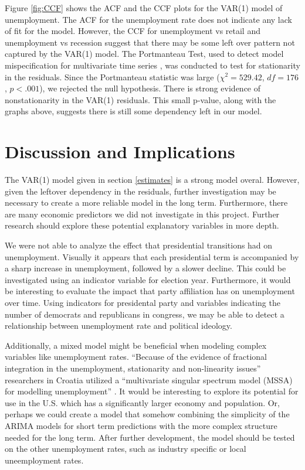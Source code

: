 \documentclass[twoside,twocolumn]{article}
\begin{document}
Figure \ref{fig:CCF} shows the ACF and the CCF plots for the VAR(1) model of unemployment.  The ACF for the unemployment rate does not indicate any lack of fit for the model. However, the CCF for unemployment vs retail and unemployment vs recession suggest that there may be some left over pattern not captured by the VAR(1) model.   The Portmanteau Test, used to detect model mispecification for multivariate time series \citep{davies1979}, was conducted to test for stationarity in the residuals. Since the Portmanteau statistic was large (\(\chi^2=529.42\), \(df = 176\), \(p < .001\)), we rejected the null hypothesis. There is  strong evidence of nonstationarity in the VAR(1) residuals. This small p-value, along with the graphs above, suggests there is still some dependency left in our model.

\section{Discussion and Implications}

The VAR(1) model given in section \ref{estimates} is a strong model overal. However, given the leftover dependency in the residuals, further investigation may be necessary to create a more reliable model in the long term. Furthermore, there are many economic predictors we did not investigate in this project. Further research should explore these potential explanatory variables in more depth.

We were not able to analyze the effect that presidential transitions had on unemployment.  Visually it appears that each presidential term is accompanied by a sharp increase in unemployment, followed by a slower decline.   This could be investigated using an indicator variable for election year.  Furthermore, it would be interesting to evaluate the impact that party affiliation has on unemployment over time.  Using indicators for presidental party and variables indicating the number of democrats and republicans in congress, we may be able to detect a relationship between unemployment rate and political ideology.

Additionally, a mixed model might be beneficial when modeling complex variables like unemployment rates.  ``Because of the evidence of fractional integration in the unemployment, stationarity and non-linearity issues'' researchers in Croatia utilized a ``multivariate singular spectrum model (MSSA) for modelling unemployment'' \citep{Skare2015}. It would be interesting to explore its potential for use in the U.S. which has a significantly larger economy and population.  Or, perhaps we could create a model that somehow combining the simplicity of the ARIMA models for short term predictions with the more complex structure needed for the long term. After further development, the model should be tested on the other unemployment rates, such as industry specific or local uneemployment rates.
\end{document}
